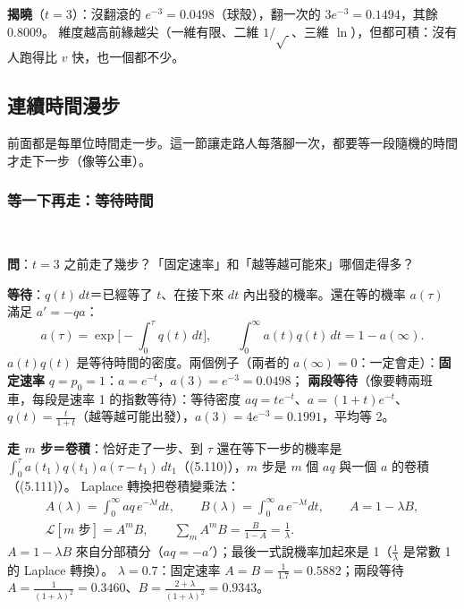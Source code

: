 \begin{table}[htbp]
\centering
\small
\FiveTabRT\qquad
\FiveTabDims
\caption{左：三維的徑向密度 $P_3$（$\int P_3\,dr=1-e^{-t}$）與球殼的重量 $e^{-t}$。右：$t=3$ 時三個維度的比較
（一維看 $|x|$；模擬 10 萬個、種子 5；最後一列是連續部分在前緣 $r\to vt$ 的行為）}\label{five-tab-rt}
\end{table}

\textbf{揭曉}（$t=3$）：沒翻滾的 $e^{-3}=0.0498$（球殼），翻一次的 $3e^{-3}=0.1494$，其餘 0.8009。
維度越高前緣越尖（一維有限、二維 $1/\sqrt{\ }$、三維 $\ln$），但都可積：沒有人跑得比 $v$ 快，也一個都不少。

\subsection{連續時間漫步}
\leavevmode{}\quad 前面都是每單位時間走一步。這一節讓走路人每落腳一次，都要等一段隨機的時間才走下一步（像等公車）。

\subsubsection{等一下再走：等待時間}
\leavevmode{}\ \par\nopagebreak

\textbf{問}：$t=3$ 之前走了幾步？「固定速率」和「越等越可能來」哪個走得多？

\textbf{等待}：$q(t)\,dt$＝已經等了 $t$、在接下來 $dt$ 內出發的機率。還在等的機率 $a(\tau)$ 滿足 $a'=-qa$：
\[a(\tau)=\exp\Big[-\int_0^\tau q(t)\,dt\Big],\qquad \int_0^\infty a(t)q(t)\,dt=1-a(\infty).\tag{5.108, 5.109}\]
$a(t)q(t)$ 是等待時間的密度。兩個例子（兩者的 $a(\infty)=0$：一定會走）：\textbf{固定速率} $q=p_0=1$：$a=e^{-t}$，$a(3)=e^{-3}=0.0498$；
\textbf{兩段等待}（像要轉兩班車，每段是速率 1 的指數等待）：等待密度 $aq=te^{-t}$、$a=(1+t)e^{-t}$、$q(t)=\frac{t}{1+t}$（越等越可能出發），$a(3)=4e^{-3}=0.1991$，平均等 2。

\textbf{走 $m$ 步＝卷積}：恰好走了一步、到 $\tau$ 還在等下一步的機率是 $\int_0^\tau a(t_1)q(t_1)a(\tau-t_1)\,dt_1$（(5.110)），$m$ 步是 $m$ 個 $aq$ 與一個 $a$ 的卷積（(5.111)）。
Laplace 轉換把卷積變乘法：
\begin{gather*}
A(\lambda)=\int_0^\infty aq\,e^{-\lambda t}dt,\qquad B(\lambda)=\int_0^\infty a\,e^{-\lambda t}dt,\qquad A=1-\lambda B,\tag{5.117--5.119}\\
\mathcal L[m\text{ 步}]=A^mB,\qquad \sum_mA^mB=\frac{B}{1-A}=\frac1\lambda.\tag{5.121, 5.122}
\end{gather*}
$A=1-\lambda B$ 來自分部積分（$aq=-a'$）；最後一式說機率加起來是 1（$\frac1\lambda$ 是常數 1 的 Laplace 轉換）。
$\lambda=0.7$：固定速率 $A=B=\frac1{1.7}=0.5882$；兩段等待 $A=\frac1{(1+\lambda)^2}=0.3460$、$B=\frac{2+\lambda}{(1+\lambda)^2}=0.9343$。

